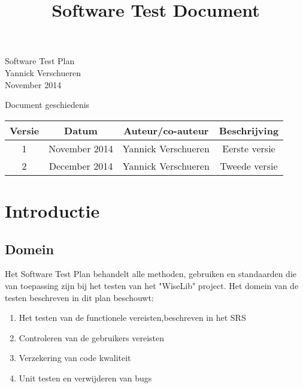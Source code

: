 \documentclass[a4paper]{article}
\title{Software Test Document}
\begin{document}
\begin{titlepage}
\vspace*{\fill}
\begin{center}
{\Huge Software Test Plan}\\[0.5cm]
{\Large Yannick Verschueren}\\[0.4cm]
November 2014
\end{center}
\vspace*{\fill}
\end{titlepage}

\newpage

Document geschiedenis

\begin{center}
\begin{tabular}{ c | c | c | c}

Versie & Datum & Auteur/co-auteur & Beschrijving \\ \hline

\hline

1 & November 2014 & Yannick Verschueren & Eerste versie \\

2 & December 2014 & Yannick Verschueren & Tweede versie \\

\hline

\end{tabular}
\end{center}

\newpage

\renewcommand\contentsname{Inhoudstafel}
\tableofcontents

\newpage

\section{Introductie}
\subsection{Domein}

Het Software Test Plan behandelt alle methoden, gebruiken en standaarden die van toepassing zijn bij het testen van het "WiseLib" project. Het domein van de testen beschreven in dit plan beschouwt:

\begin{enumerate}
\item Het testen van de functionele vereisten,beschreven in het SRS %
\item Controleren van de gebruikers vereisten %
\item Verzekering van code kwaliteit
\item Unit testen en verwijderen van bugs

\end{enumerate}
\end{document}
